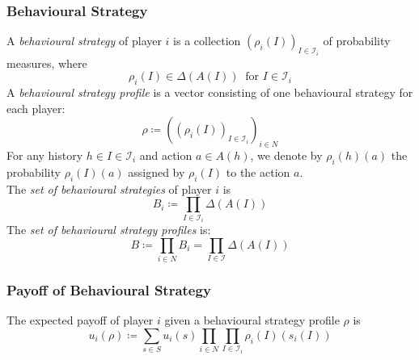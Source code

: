\documentclass[UTF8,11pt,colorlinks,compress,openany]{beamer}%
\begin{document}
\begin{frame}\frametitle{Behavioural Strategy}
\setlength\abovedisplayskip{0pt}
\begin{definition}
	A \emph{behavioural strategy} of player $i$ is a collection $(\rho_i(I))_{I\in\mathcal{I}_i}$ of probability measures, where \[\rho_i(I)\in\Delta(A(I))\;\;\text{for $I\in\mathcal{I}_i$}\]
	A \emph{behavioural strategy profile} is a vector consisting of one	behavioural strategy for each player:
	\[\rho\coloneqq \left((\rho_i(I))_{I\in\mathcal{I}_i}\right)_{i\in N}\]
	For any history $h\in I\in\mathcal{I}_i$ and action $a\in A(h)$, we denote by $\rho_i(h)(a)$ the probability $\rho_i(I)(a)$ assigned by $\rho_i(I)$ to the action $a$.\\
	The \emph{set of behavioural strategies} of player $i$ is
	\[B_i\coloneqq \prod\limits_{I\in\mathcal{I}_i}\Delta(A(I))\]
	The \emph{set of behavioural strategy profiles} is:
	\[B\coloneqq \prod\limits_{i\in N}B_i=\prod\limits_{I\in\mathcal{I}}\Delta(A(I))\]
\end{definition}
\end{frame}

\begin{frame}\frametitle{Payoff of Behavioural Strategy}
\begin{definition}
	The expected payoff of player $i$ given a behavioural strategy profile $\rho$ is
	\[u_i(\rho)\coloneqq \sum\limits_{s\in S}u_i(s)\prod\limits_{i\in N}\prod\limits_{I\in\mathcal{I}_i}\rho_i(I)(s_i(I))\]
\end{definition}
\end{frame}
\end{document}
